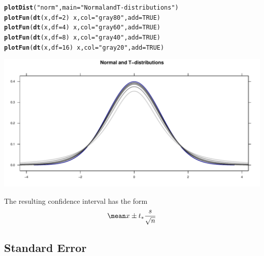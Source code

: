 \documentclass[twoside]{book}\usepackage[]{graphicx}\usepackage[]{xcolor}
\makeatletter
\def\maxwidth{ %
  \ifdim\Gin@nat@width>\linewidth
    \linewidth
  \else
    \Gin@nat@width
  \fi
}
\newcommand{\hlnum}[1]{\textcolor[rgb]{0.686,0.059,0.569}{#1}}%
\newcommand{\hlstr}[1]{\textcolor[rgb]{0.192,0.494,0.8}{#1}}%
\newcommand{\hlopt}[1]{\textcolor[rgb]{0,0,0}{#1}}%
\newcommand{\hlstd}[1]{\textcolor[rgb]{0.345,0.345,0.345}{#1}}%
\newcommand{\hlkwc}[1]{\textcolor[rgb]{0.333,0.667,0.333}{#1}}%
\newcommand{\hlkwd}[1]{\textcolor[rgb]{0.737,0.353,0.396}{\textbf{#1}}}%
\newenvironment{kframe}{%
 \def\at@end@of@kframe{}%
 \ifinner\ifhmode%
  \def\at@end@of@kframe{\end{minipage}}%
  \begin{minipage}{\columnwidth}%
 \fi\fi%
 \def\FrameCommand##1{\hskip\@totalleftmargin \hskip-\fboxsep
 \colorbox{shadecolor}{##1}\hskip-\fboxsep
     \hskip-\linewidth \hskip-\@totalleftmargin \hskip\columnwidth}%
 \MakeFramed {\advance\hsize-\width
   \@totalleftmargin\z@ \linewidth\hsize
   \@setminipage}}%
 {\par\unskip\endMakeFramed%
 \at@end@of@kframe}
\newenvironment{knitrout}{}{} %
\makeatother
\begin{document}
\begin{knitrout}
\color{fgcolor}\begin{kframe}
\begin{alltt}
\hlkwd{plotDist}\hlstd{(}\hlstr{"norm"}\hlstd{,} \hlkwc{main} \hlstd{=} \hlstr{"Normal and T-distributions"}\hlstd{)}
\hlkwd{plotFun}\hlstd{(}\hlkwd{dt}\hlstd{(x,} \hlkwc{df} \hlstd{=} \hlnum{2}\hlstd{)} \hlopt{~} \hlstd{x,} \hlkwc{col} \hlstd{=} \hlstr{"gray80"}\hlstd{,} \hlkwc{add} \hlstd{=} \hlnum{TRUE}\hlstd{)}
\hlkwd{plotFun}\hlstd{(}\hlkwd{dt}\hlstd{(x,} \hlkwc{df} \hlstd{=} \hlnum{4}\hlstd{)} \hlopt{~} \hlstd{x,} \hlkwc{col} \hlstd{=} \hlstr{"gray60"}\hlstd{,} \hlkwc{add} \hlstd{=} \hlnum{TRUE}\hlstd{)}
\hlkwd{plotFun}\hlstd{(}\hlkwd{dt}\hlstd{(x,} \hlkwc{df} \hlstd{=} \hlnum{8}\hlstd{)} \hlopt{~} \hlstd{x,} \hlkwc{col} \hlstd{=} \hlstr{"gray40"}\hlstd{,} \hlkwc{add} \hlstd{=} \hlnum{TRUE}\hlstd{)}
\hlkwd{plotFun}\hlstd{(}\hlkwd{dt}\hlstd{(x,} \hlkwc{df} \hlstd{=} \hlnum{16}\hlstd{)} \hlopt{~} \hlstd{x,} \hlkwc{col} \hlstd{=} \hlstr{"gray20"}\hlstd{,} \hlkwc{add} \hlstd{=} \hlnum{TRUE}\hlstd{)}
\end{alltt}
\end{kframe}

{\centering \includegraphics[width=\maxwidth]{figures/fig-unnamed-chunk-130-1} 

}



\end{knitrout}

The resulting confidence interval has the form
\[
\mean x \pm t_* \frac{s}{\sqrt{n}}
\]



\subsection{Standard Error}
\end{document}
